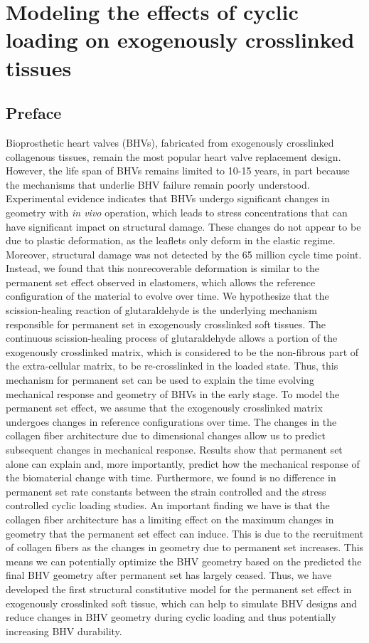 \chapter{Modeling the effects of cyclic loading on exogenously cross\Hyphdash linked tissues}

\section*{Preface}
%

    Bioprosthetic heart valves (BHVs), fabricated from exogenously crosslinked collagenous tissues, remain the most popular heart valve replacement design. However, the life span of BHVs remains limited to 10-15 years, in part because the mechanisms that underlie BHV failure remain poorly understood. Experimental evidence indicates that BHVs undergo significant changes in geometry with \textit{in vivo} operation, which leads to stress concentrations that can have significant impact on structural damage. These changes do not appear to be due to plastic deformation, as the leaflets only deform in the elastic regime. Moreover, structural damage was not detected by the 65 million cycle time point. Instead, we found that this nonrecoverable deformation is similar to the permanent set effect observed in elastomers, which allows the reference configuration of the material to evolve over time. We hypothesize that the scission-healing reaction of glutaraldehyde is the underlying mechanism responsible for permanent set in exogenously crosslinked soft tissues. The continuous scission-healing process of glutaraldehyde allows a portion of the exogenously crosslinked matrix, which is considered to be the non-fibrous part of the extra-cellular matrix, to be re-crosslinked in the loaded state. Thus, this mechanism for permanent set can be used to explain the time evolving mechanical response and geometry of BHVs in the early stage. To model the permanent set effect, we assume that the exogenously crosslinked matrix undergoes changes in reference configurations over time. The changes in the collagen fiber architecture due to dimensional changes allow us to predict subsequent changes in mechanical response. Results show that permanent set alone can explain and, more importantly, predict how the mechanical response of the biomaterial change with time. Furthermore, we found is no difference in permanent set rate constants between the strain controlled and the stress controlled cyclic loading studies. An important finding we have is that the collagen fiber architecture has a limiting effect on the maximum changes in geometry that the permanent set effect can induce. This is due to the recruitment of collagen fibers as the changes in geometry due to permanent set increases. This means we can potentially optimize the BHV geometry based on the predicted the final BHV geometry after permanent set has largely ceased. Thus, we have developed the first structural constitutive model for the permanent set effect in exogenously crosslinked soft tissue, which can help to simulate BHV designs and reduce changes in BHV geometry during cyclic loading and thus potentially increasing BHV durability.
    
